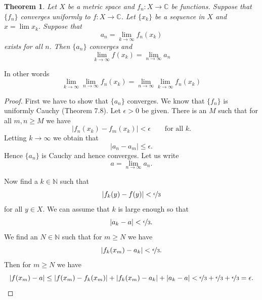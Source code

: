 \documentclass[12pt]{book}
\newcommand{\abs}[1]{\left\lvert {#1} \right\rvert}
\newcommand{\C}{{\mathbb{C}}}
\newcommand{\N}{{\mathbb{N}}}
\theoremstyle{plain}
\newtheorem{thm}{Theorem}[section]
\theoremstyle{remark}
\theoremstyle{definition}
\theoremstyle{exercise}
\theoremstyle{example}
\begin{document}
\begin{thm}
Let $X$ be a metric space and
$f_n \colon X \to \C$ be functions.
Suppose that $\{ f_n \}$ converges uniformly to $f \colon X \to \C$.  
Let $\{ x_k \}$ be a sequence in $X$ and $x = \lim x_k$.  Suppose
that
\begin{equation*}
a_n = \lim_{k \to \infty} f_n(x_k)
\end{equation*}
exists for all $n$.  Then
$\{a_n\}$ converges and 
\begin{equation*}
\lim_{k \to \infty} f(x_k) = \lim_{n\to\infty} a_n
\end{equation*}
\end{thm}

In other words
\begin{equation*}
\lim_{k \to \infty} \lim_{n\to\infty} f_n(x_k) =
\lim_{n \to \infty} \lim_{k\to\infty} f_n(x_k)
\end{equation*}

\begin{proof}
First we have to show that $\{ a_n \}$ converges.  We know that
$\{ f_n \}$ is uniformly Cauchy (Theorem 7.8). 
Let $\epsilon > 0$ be given.  There is
an $M$ such that for all $m,n \geq M$ we have
\begin{equation*}
\abs{f_n(x_k)-f_m(x_k)} < \epsilon \qquad \text{for all $k$} .
\end{equation*}
Letting $k \to \infty$ we obtain that
$$
\abs{a_n-a_m} \leq \epsilon .
$$
Hence $\{a_n\}$ is Cauchy and hence converges.  Let us
write
$$
a = \lim_{n\to\infty} a_n .
$$

Now find a $k \in \N$ such that
\begin{equation*}
\abs{f_k(y)-f(y)} < \nicefrac{\epsilon}{3}
\end{equation*}
for all $y \in X$.  We can assume that $k$ is large enough
so that
\begin{equation*}
\abs{a_k-a} < \nicefrac{\epsilon}{3}  .
\end{equation*}
We find an $N \in \N$ such that for $m \geq N$
we have 
\begin{equation*}
\abs{f_k(x_m)-a_k} < \nicefrac{\epsilon}{3}  .
\end{equation*}
Then for
$m \geq N$ we have
\begin{equation*}
\abs{f(x_m)-a}
\leq
\abs{f(x_m)-f_k(x_m)}+ \abs{f_k(x_m)-a_k}+ \abs{a_k-a}
<
\nicefrac{\epsilon}{3} +
\nicefrac{\epsilon}{3} +
\nicefrac{\epsilon}{3} = \epsilon .
\end{equation*}
\end{proof}
\end{document}
